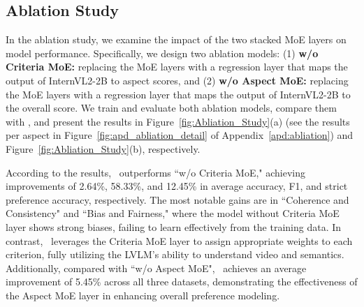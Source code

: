 \subsection{Ablation Study}\label{sec:abliation_study}

In the ablation study, we examine the impact of the two stacked MoE layers on model performance. Specifically, we design two ablation models: (1) \textbf{w/o Criteria MoE:} replacing the MoE layers with a regression layer that maps the output of InternVL2-2B to aspect scores, and (2) \textbf{w/o Aspect MoE:} replacing the MoE layers with a regression layer that maps the output of InternVL2-2B to the overall score. We train and evaluate both ablation models, compare them with \algname, and present the results in Figure~\ref{fig:Abliation_Study}(a) (see the results per aspect in Figure~\ref{fig:apd_abliation_detail} of Appendix~\ref{apd:abliation}) and Figure~\ref{fig:Abliation_Study}(b), respectively.

According to the results, \algname\ outperforms ``w/o Criteria MoE," achieving improvements of 2.64\%, 58.33\%, and 12.45\% in average accuracy, F1, and strict preference accuracy, respectively. The most notable gains are in ``Coherence and Consistency" and ``Bias and Fairness," where the model without Criteria MoE layer shows strong biases, failing to learn effectively from the training data. In contrast, \algname\ leverages the Criteria MoE layer to assign appropriate weights to each criterion, fully utilizing the LVLM’s ability to understand video and semantics. Additionally, compared with ``w/o Aspect MoE", \algname\ achieves an average improvement of 5.45\% across all three datasets, demonstrating the effectiveness of the Aspect MoE layer in enhancing overall preference modeling.















